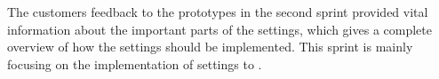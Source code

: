 The customers feedback to the prototypes in the second sprint provided vital information about the important parts of the settings, which gives a complete overview of how the settings should be implemented.
This sprint is mainly focusing on the implementation of settings to \launcher.